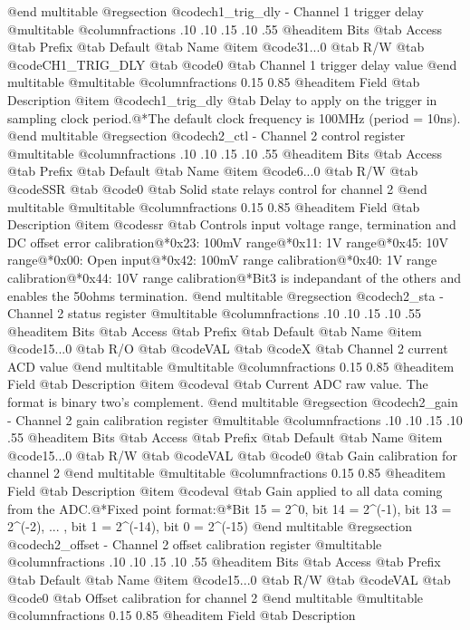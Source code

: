 @end multitable
@regsection @code{ch1_trig_dly} - Channel 1 trigger delay
@multitable @columnfractions .10 .10 .15 .10 .55
@headitem Bits @tab Access @tab Prefix @tab Default @tab Name
@item @code{31...0}
@tab R/W @tab
@code{CH1_TRIG_DLY}
@tab @code{0} @tab 
Channel 1 trigger delay value
@end multitable
@multitable @columnfractions 0.15 0.85
@headitem Field @tab Description
@item @code{ch1_trig_dly} @tab Delay to apply on the trigger in sampling clock period.@*The default clock frequency is 100MHz (period = 10ns).
@end multitable
@regsection @code{ch2_ctl} - Channel 2 control register
@multitable @columnfractions .10 .10 .15 .10 .55
@headitem Bits @tab Access @tab Prefix @tab Default @tab Name
@item @code{6...0}
@tab R/W @tab
@code{SSR}
@tab @code{0} @tab 
Solid state relays control for channel 2
@end multitable
@multitable @columnfractions 0.15 0.85
@headitem Field @tab Description
@item @code{ssr} @tab Controls input voltage range, termination and DC offset error calibration@*0x23: 100mV range@*0x11: 1V range@*0x45: 10V range@*0x00: Open input@*0x42: 100mV range calibration@*0x40: 1V range calibration@*0x44: 10V range calibration@*Bit3 is indepandant of the others and enables the 50ohms termination.
@end multitable
@regsection @code{ch2_sta} - Channel 2 status register
@multitable @columnfractions .10 .10 .15 .10 .55
@headitem Bits @tab Access @tab Prefix @tab Default @tab Name
@item @code{15...0}
@tab R/O @tab
@code{VAL}
@tab @code{X} @tab 
Channel 2 current ACD value
@end multitable
@multitable @columnfractions 0.15 0.85
@headitem Field @tab Description
@item @code{val} @tab Current ADC raw value. The format is binary two's complement.
@end multitable
@regsection @code{ch2_gain} - Channel 2 gain calibration register
@multitable @columnfractions .10 .10 .15 .10 .55
@headitem Bits @tab Access @tab Prefix @tab Default @tab Name
@item @code{15...0}
@tab R/W @tab
@code{VAL}
@tab @code{0} @tab 
Gain calibration for channel 2
@end multitable
@multitable @columnfractions 0.15 0.85
@headitem Field @tab Description
@item @code{val} @tab Gain applied to all data coming from the ADC.@*Fixed point format:@*Bit 15 = 2^0, bit 14 = 2^(-1), bit 13 = 2^(-2), ... , bit 1 = 2^(-14), bit 0 = 2^(-15)
@end multitable
@regsection @code{ch2_offset} - Channel 2 offset calibration register
@multitable @columnfractions .10 .10 .15 .10 .55
@headitem Bits @tab Access @tab Prefix @tab Default @tab Name
@item @code{15...0}
@tab R/W @tab
@code{VAL}
@tab @code{0} @tab 
Offset calibration for channel 2
@end multitable
@multitable @columnfractions 0.15 0.85
@headitem Field @tab Description
